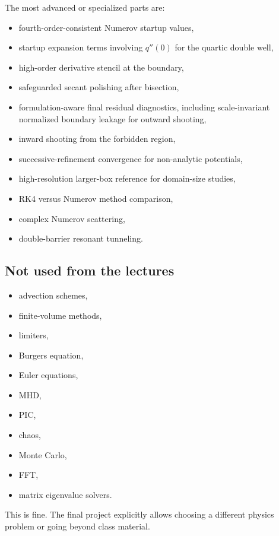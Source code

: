 \documentclass[11pt]{article}
\begin{document}
    The most advanced or specialized parts are:
    \begin{itemize}
        \item fourth-order-consistent Numerov startup values,
        \item startup expansion terms involving $q''(0)$ for the quartic double well,
        \item high-order derivative stencil at the boundary,
        \item safeguarded secant polishing after bisection,
        \item formulation-aware final residual diagnostics, including scale-invariant normalized boundary leakage for outward shooting,
        \item inward shooting from the forbidden region,
        \item successive-refinement convergence for non-analytic potentials,
        \item high-resolution larger-box reference for domain-size studies,
        \item RK4 versus Numerov method comparison,
        \item complex Numerov scattering,
        \item double-barrier resonant tunneling.
    \end{itemize}

    \subsection{Not used from the lectures}

    \begin{itemize}
        \item advection schemes,
        \item finite-volume methods,
        \item limiters,
        \item Burgers equation,
        \item Euler equations,
        \item MHD,
        \item PIC,
        \item chaos,
        \item Monte Carlo,
        \item FFT,
        \item matrix eigenvalue solvers.
    \end{itemize}

    This is fine. The final project explicitly allows choosing a different physics problem or going beyond class material.
\end{document}

